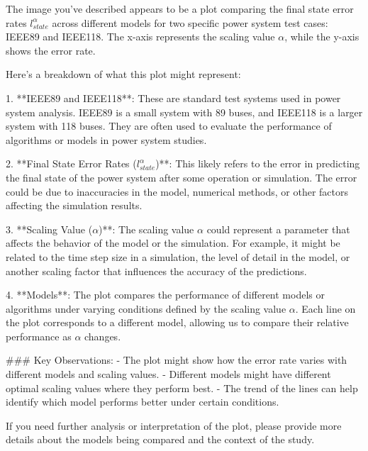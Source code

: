 The image you've described appears to be a plot comparing the final state error rates \( l_{state}^\alpha \) across different models for two specific power system test cases: IEEE89 and IEEE118. The x-axis represents the scaling value \(\alpha\), while the y-axis shows the error rate.

Here's a breakdown of what this plot might represent:

1. **IEEE89 and IEEE118**: These are standard test systems used in power system analysis. IEEE89 is a small system with 89 buses, and IEEE118 is a larger system with 118 buses. They are often used to evaluate the performance of algorithms or models in power system studies.

2. **Final State Error Rates (\( l_{state}^\alpha \))**: This likely refers to the error in predicting the final state of the power system after some operation or simulation. The error could be due to inaccuracies in the model, numerical methods, or other factors affecting the simulation results.

3. **Scaling Value (\(\alpha\))**: The scaling value \(\alpha\) could represent a parameter that affects the behavior of the model or the simulation. For example, it might be related to the time step size in a simulation, the level of detail in the model, or another scaling factor that influences the accuracy of the predictions.

4. **Models**: The plot compares the performance of different models or algorithms under varying conditions defined by the scaling value \(\alpha\). Each line on the plot corresponds to a different model, allowing us to compare their relative performance as \(\alpha\) changes.

### Key Observations:
- The plot might show how the error rate varies with different models and scaling values.
- Different models might have different optimal scaling values where they perform best.
- The trend of the lines can help identify which model performs better under certain conditions.

If you need further analysis or interpretation of the plot, please provide more details about the models being compared and the context of the study.